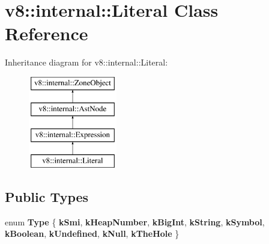 \hypertarget{classv8_1_1internal_1_1Literal}{}\section{v8\+:\+:internal\+:\+:Literal Class Reference}
\label{classv8_1_1internal_1_1Literal}
Inheritance diagram for v8\+:\+:internal\+:\+:Literal\+:\begin{figure}[H]
\begin{center}
\leavevmode
\includegraphics[height=4.000000cm]{classv8_1_1internal_1_1Literal}
\end{center}
\end{figure}
\subsection*{Public Types}
\begin{DoxyCompactItemize}
\item 
\mbox{\label{classv8_1_1internal_1_1Literal_aebdc45fab4b314d13410bd3285391f1c}} 
enum {\bfseries Type} \{ \newline
{\bfseries k\+Smi}, 
{\bfseries k\+Heap\+Number}, 
{\bfseries k\+Big\+Int}, 
{\bfseries k\+String}, 
\newline
{\bfseries k\+Symbol}, 
{\bfseries k\+Boolean}, 
{\bfseries k\+Undefined}, 
{\bfseries k\+Null}, 
\newline
{\bfseries k\+The\+Hole}
 \}
\end{DoxyCompactItemize}
